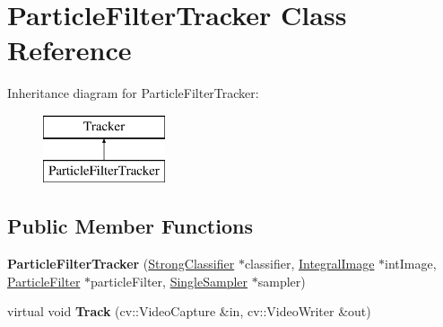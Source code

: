\hypertarget{classParticleFilterTracker}{}\section{Particle\+Filter\+Tracker Class Reference}
\label{classParticleFilterTracker}
Inheritance diagram for Particle\+Filter\+Tracker\+:\begin{figure}[H]
\begin{center}
\leavevmode
\includegraphics[height=2.000000cm]{classParticleFilterTracker}
\end{center}
\end{figure}
\subsection*{Public Member Functions}
\begin{DoxyCompactItemize}
\item 
\hypertarget{classParticleFilterTracker_a56215e77de915ef13052a697073bf8d1}{}{\bfseries Particle\+Filter\+Tracker} (\hyperlink{classStrongClassifier}{Strong\+Classifier} $\ast$classifier, \hyperlink{classIntegralImage}{Integral\+Image} $\ast$int\+Image, \hyperlink{classParticleFilter}{Particle\+Filter} $\ast$particle\+Filter, \hyperlink{classSingleSampler}{Single\+Sampler} $\ast$sampler)\label{classParticleFilterTracker_a56215e77de915ef13052a697073bf8d1}

\item 
\hypertarget{classParticleFilterTracker_ad19ecb5024b65756896dc53293ea4d56}{}virtual void {\bfseries Track} (cv\+::\+Video\+Capture \&in, cv\+::\+Video\+Writer \&out)\label{classParticleFilterTracker_ad19ecb5024b65756896dc53293ea4d56}

\end{DoxyCompactItemize}
